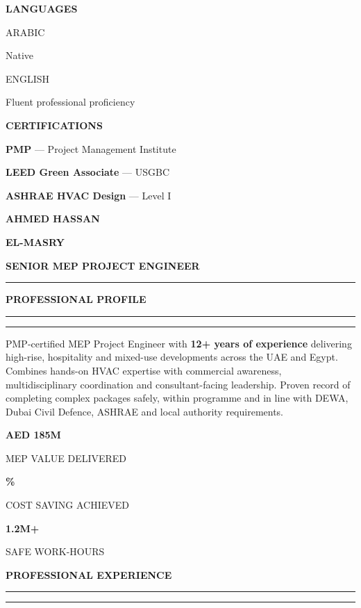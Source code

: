 \documentclass[10pt,a4paper]{article}
\newcommand{\sectiontitle}[1]{%
  \vspace{5pt}%
  {\color{navy}\bfseries\fontsize{11.3}{13}\selectfont\MakeUppercase{#1}}\par
  \vspace{1.5pt}%
  {\color{gold}\rule{1.7cm}{1.35pt}}\hspace{2pt}%
  {\color{line}\rule{\dimexpr\linewidth-1.7cm-2pt\relax}{0.45pt}}\par
  \vspace{3pt}%
}
\newcommand{\sideheading}[1]{%
  \vspace{4pt}%
  {\color{white}\bfseries\fontsize{10.2}{12}\selectfont\MakeUppercase{#1}}\par
  \vspace{1pt}{\color{gold}\rule{0.72cm}{1.2pt}}\par\vspace{2pt}%
}
\newcommand{\detailrow}[2]{%
  {\color{white!68}\fontsize{7.6}{9}\selectfont\MakeUppercase{#1}}\par
  {\color{white}\fontsize{9}{10.7}\selectfont #2}\par\vspace{2.5pt}%
}
\newcommand{\metric}[2]{%
  \begin{minipage}[t]{0.31\linewidth}\centering
    {\color{teal}\bfseries\fontsize{15}{16}\selectfont #1}\par
    {\color{muted}\fontsize{7.4}{8.6}\selectfont\MakeUppercase{#2}}
  \end{minipage}%
}
\begin{document}
\begin{minipage}[t]{5.03cm}
  \sideheading{Languages}
  \detailrow{Arabic}{Native}
  \detailrow{English}{Fluent professional proficiency}

  \sideheading{Certifications}
  {\fontsize{8.35}{10.2}\selectfont
    \textbf{PMP} — Project Management Institute\par\vspace{3pt}
    \textbf{LEED Green Associate} — USGBC\par\vspace{3pt}
    \textbf{ASHRAE HVAC Design} — Level I\par
  }
\end{minipage}%
\hspace{1.08cm}%
\begin{minipage}[t]{12.15cm}
  \vspace{0.12cm}

  {\color{navy}\bfseries\fontsize{25}{28}\selectfont AHMED HASSAN}\par
  {\color{teal}\bfseries\fontsize{25}{28}\selectfont EL-MASRY}\par
  \vspace{4pt}
  {\color{muted}\bfseries\fontsize{11.6}{14}\selectfont SENIOR MEP PROJECT ENGINEER}\par
  \vspace{3pt}
  {\color{gold}\rule{2.0cm}{1.6pt}}\hspace{4pt}{\color{line}\rule{8.8cm}{0.5pt}}

  \sectiontitle{Professional Profile}
  \justifying\fontsize{9.1}{11.25}\selectfont
  PMP-certified MEP Project Engineer with \textbf{12+ years of experience} delivering
  high-rise, hospitality and mixed-use developments across the UAE and Egypt. Combines
  hands-on HVAC expertise with commercial awareness, multidisciplinary coordination and
  consultant-facing leadership. Proven record of completing complex packages safely,
  within programme and in line with DEWA, Dubai Civil Defence, ASHRAE and local authority
  requirements.

  \vspace{5pt}
  \noindent
  \metric{AED 185M}{MEP value delivered}\hfill
  \metric{14\%}{cost saving achieved}\hfill
  \metric{1.2M+}{safe work-hours}

  \sectiontitle{Professional Experience}


\end{minipage}
\end{document}
